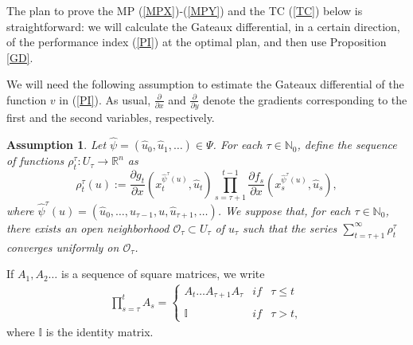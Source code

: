 \documentclass[3p]{elsarticle}
\newcommand{\rzn}{\mathbb R^{n}}
\newcommand{\nat}{\mathbb N_0}
\newtheorem{assu}[thm]{Assumption}
\begin{document}
	
	
	
	
	
	
	
	
	The plan to prove the MP (\ref{MPX})-(\ref{MPY}) and the TC (\ref{TC}) below is straightforward: we will calculate the Gateaux differential, in a certain direction,  of the performance index (\ref{PI}) at the optimal plan, and then use Proposition \ref{GD}. 
	
	We will need the following assumption to estimate the Gateaux differential of the function $v$ in (\ref{PI}). As usual, $\displaystyle\frac{\partial}{\partial x}$ and $\displaystyle\frac{\partial}{\partial y}$ denote the gradients corresponding to the first and the second variables, respectively.
	
	
	\begin{assu}\label{AMP}
		Let  $\hat \psi=(\hat u_0,\hat u_1,\dots) \in \Psi$. For each  $\tau\in\nat$, define the sequence of functions $\rho^\tau_t: U_\tau\to\rzn$ as $$\rho_t^\tau(u):=\frac{\partial g_t}{\partial x}( x_t^{{\hat\psi^\tau(u)}}, \hat u_t)\prod_{s=\tau+1}^{t-1}\frac{\partial f_s}{\partial x}(x_s^{{\hat \psi^\tau(u)}}, \hat u_s),$$ 
		where $\hat\psi^\tau(u)=(\hat u_0,\dots,\hat u_{\tau-1},u,\hat u_{\tau+1},\dots)$. 
		We suppose that, for each $\tau\in\nat$, there exists an open neighborhood $\mathcal O_\tau\subset U_\tau$ of $\hat u_\tau$ such that the series $\displaystyle\sum_{t=\tau+1}^{\infty}\rho^\tau_t$ converges uniformly on $\mathcal O_\tau$. 
	\end{assu}
	
	
	
	If 
	$A_1, A_2\dots$ is a sequence of square matrices, we write
	\begin{align*}
	\prod_{s=\tau}^t A_s=\left\{ \begin{array}{lcc}
	A_t\dots A_{\tau+1}A_{\tau} &   if  & \tau\le t \\
	\\ \mathbb I &  if &  \tau>t ,
	\end{array}
	\right.
	\textit{} \end{align*}
	where $\mathbb I$ is the identity matrix.
	
	
	
\end{document}
